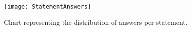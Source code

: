 \begin{figure}[t]
  \texttt{[image: StatementAnswers]}
  \caption[StatementResults]{Chart representing the distribution of answers per statement.}
  \label{fig:statementresult}
  \centering
\end{figure}